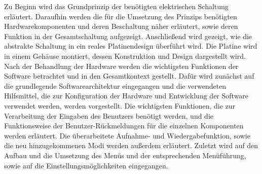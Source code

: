 Zu Beginn wird das Grundprinzip der benötigten elektrischen Schaltung erläutert. Daraufhin werden die für die Umsetzung des Prinzips benötigten Hardwarekomponenten und deren Beschaltung näher erläutert, sowie deren Funktion in der Gesamtschaltung aufgezeigt. Anschließend wird gezeigt, wie die abstrakte Schaltung in ein reales Platinendesign überführt wird. Die Platine wird in einem Gehäuse montiert, dessen Konstruktion und Design dargestellt wird. Nach der Behandlung der Hardware werden die wichtigsten Funktionen der Software betrachtet und in den Gesamtkontext gestellt. Dafür wird zunächst auf die grundlegende Softwarearchitektur eingegangen und die verwendeten Hilfsmittel, die zur Konfiguration der Hardware und Entwicklung der Software verwendet werden, werden vorgestellt. Die wichtigsten Funktionen, die zur Verarbeitung der Eingaben des Benutzers benötigt werden, und die Funktionsweise der Benutzer-Rückmeldungen für die einzelnen Komponenten werden erläutert. Die überarbeitete Aufnahme- und Wiedergabefunktion, sowie die neu hinzugekommenen Modi werden außerdem erläutert. Zuletzt wird auf den Aufbau und die Umsetzung des Menüs und der entsprechenden Menüführung, sowie auf die Einstellungsmöglichkeiten eingegangen.
